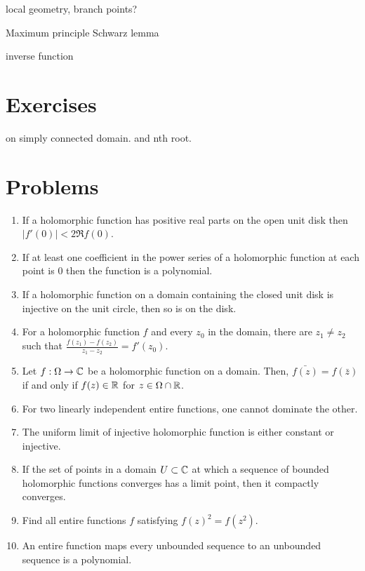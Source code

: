 \documentclass{../../large}
\begin{document}
\begin{prb}
\end{prb}


local geometry, branch points?

\begin{prb}
\end{prb}
Maximum principle
Schwarz lemma

\begin{prb}
\end{prb}
inverse function



\section*{Exercises}
\begin{prb}
\end{prb}
\begin{prb}
on simply connected domain.
and nth root.
\end{prb}
\begin{prb}
\end{prb}


\section*{Problems}

\begin{enumerate}
\item If a holomorphic function has positive real parts on the open unit disk then $|f'(0)|<2\Re f(0)$.
\item If at least one coefficient in the power series of a holomorphic function at each point is 0 then the function is a polynomial.
\item If a holomorphic function on a domain containing the closed unit disk is injective on the unit circle, then so is on the disk.
\item For a holomorphic function $f$ and every $z_0$ in the domain, there are $z_1\ne z_2$ such that $\frac{f(z_1)-f(z_2)}{z_1-z_2}=f'(z_0)$.
\item Let $f:\Omega\to\mathbb{C}$ be a holomorphic function on a domain. Then, $\bar{f(z)}=f(\bar z)$ if and only if $f(z)\in\mathbb{R}$ for $z\in\Omega\cap\mathbb{R}$.
\item For two linearly independent entire functions, one cannot dominate the other.
\item The uniform limit of injective holomorphic function is either constant or injective.
\item If the set of points in a domain $U\subset\mathbb{C}$ at which a sequence of bounded holomorphic functions converges has a limit point, then it compactly converges.
\item Find all entire functions $f$ satisfying $f(z)^2=f(z^2)$.
\item An entire function maps every unbounded sequence to an unbounded sequence is a polynomial.
\end{enumerate}
\end{document}
